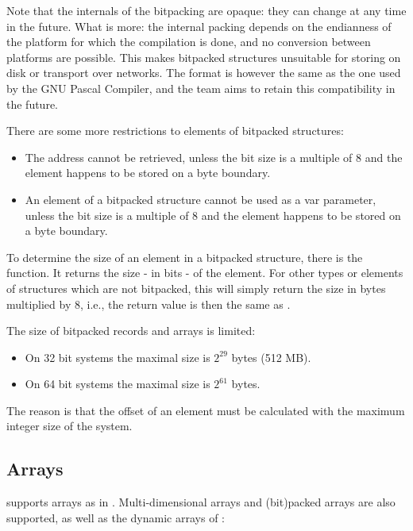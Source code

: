 Note that the internals of the bitpacking are opaque: they can change
at any time in the future. What is more: the internal packing depends
on the endianness of the platform for which the compilation is done,
and no conversion between platforms are possible. This makes bitpacked
structures unsuitable for storing on disk or transport over networks.
The format is however the same as the one used by the GNU Pascal
Compiler, and the \fpc team aims to retain this compatibility in the future.

There are some more restrictions to elements of bitpacked structures:
\begin{itemize}
\item The address cannot be retrieved, unless the bit size is a multiple of
8 and the element happens to be stored on a byte boundary.
\item An element of a bitpacked structure cannot be used as a var parameter,
unless the bit size is a multiple of 8 and the element happens to be stored 
on a byte boundary.
\end{itemize}

To determine the size of an element in a bitpacked structure, there is the 
 function. It returns the size - in bits - of the element. 
For other types or elements of structures which are not bitpacked, this will 
simply return the size in bytes multiplied by 8, i.e., the return value is 
then the same as .

The size of bitpacked records and arrays is limited:
\begin{itemize}
\item On 32 bit systems the maximal size is $2^{29}$ bytes (512 MB).
\item On 64 bit systems the maximal size is $2^{61}$ bytes.
\end{itemize}
The reason is that the offset of an element must be calculated with 
the maximum integer size of the system.

%
\subsection{Arrays}
\fpc supports arrays as in \tp. Multi-dimensional arrays and (bit)packed 
arrays are also supported, as well as the dynamic arrays of \delphi:

%
